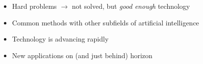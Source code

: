 \documentclass[landscape]{jhuslides3C}
\begin{document}

\vfill
\begin{itemize}
\item Hard problems $\rightarrow$ not solved, but {\em good enough} technology
\item Common methods with other subfields of artificial intelligence
\item Technology is advancing rapidly
\item New applications on (and just behind) horizon
\end{itemize}
\vfill

\end{document}
